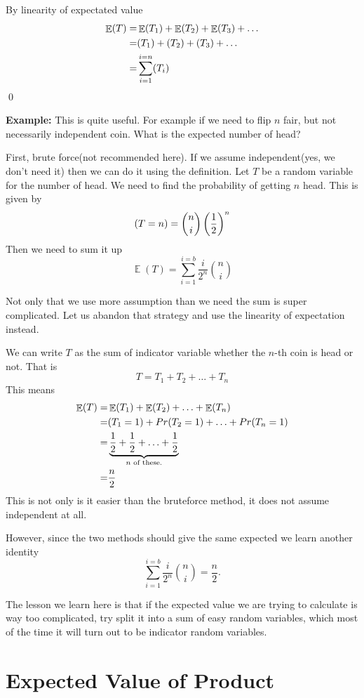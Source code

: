 \documentclass[a4paper, 12pt]{article}
\newcommand{\half}{\ensuremath{\frac{1}{2}}}
\newcommand{\example}{\vspace{1em}\noindent\textbf{Example:} }
\newcommand{\qedd}{\qed\newline}
\let\Pr\relax
\DeclareMathOperator{\Pr}{Pr}
\DeclareMathOperator{\E}{\mathbb{E}}
\begin{document}
\begin{multicols}{2}
By linearity of expectated value
\begin{align*}
	\E (T) =& \E(T_1) + \E(T_2) + \E(T_3) + \ldots\\
	=& \Pr(T_1) + \Pr(T_2) + \Pr(T_3) + \ldots\\
	=& \sum_{i=1}^{i=n} \Pr(T_i)
\end{align*}
\qedd

\example This is quite useful. For example if we need to flip $n$ fair, but not necessarily independent coin. What is the expected number of head?

First, brute force(not recommended here). If we assume independent(yes, we don't need it) then we can do it using the definition. Let $T$ be a random variable for the number of head. We need to find the probability of getting $n$ head. This is given by
\[
	\Pr(T=n) = {n \choose i} \left(\half \right)^n
\]  
Then we need to sum it up
\[
	\E(T)= \sum_{i=1}^{i=b} \frac{i}{2^n} {n \choose i}
\]

Not only that we use more assumption than we need the sum is super complicated. Let us abandon that strategy and use the linearity of expectation instead.

We can write $T$ as the sum of indicator variable whether the $n$-th coin is head or not. That is
\[
	T = T_1 + T_2 + \ldots + T_n
\]
This means
\begin{align*}
	\E(T) =& \E(T_1) + \E(T_2) + \ldots + \E(T_n)\\
	=& \Pr(T_1=1) + Pr(T_2=1) + \ldots + Pr(T_n=1)\\
	=& \underbrace{\half + \half + \ldots + \half}_{n \text{ of these.}}\\
	=& \frac{n}{2}
\end{align*}
This is not only is it easier than the bruteforce method, it does not assume independent at all.

However, since the two methods should give the same expected we learn another identity
\[
	\sum_{i=1}^{i=b} \frac{i}{2^n} {n \choose i} = \frac{n}{2}.
\]

The lesson we learn here is that if the expected value we are trying to calculate is way too complicated, try split it into a sum of easy random variables, which most of the time it will turn out to be indicator random variables.

\section*{Expected Value of Product}


\end{multicols}
\end{document}
